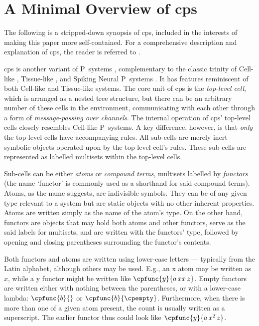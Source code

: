 \section{\label{sec:nmp:cpsreview}A Minimal Overview of \texorpdfstring{\gls{cps}}{cP~systems}}
The following is a stripped-down synopsis of \gls{cps}, included in the interests of making this paper more self-contained.  For a comprehensive description and explanation of \gls{cps}, the reader is referred to \cite{Henderson2019,Henderson2020,Nicolescu2018}.

\gls{cps} is another variant of P~systems \cite{Paun2001,Paun2002a,Paun2010b}, complementary to the classic trinity of Cell-like \cite{Paun2000}, Tissue-like \cite{Martin-Vide2003}, and Spiking Neural P~systems \cite{Ionescu2006}.  It has features reminiscent of both Cell-like and Tissue-like systems.  The core unit of \gls{cps} is the \emph{top-level cell}, which is arranged as a nested tree structure, but there can be an arbitrary number of these cells in the environment, communicating with each other through a form of \emph{message-passing over channels}.  The internal operation of \gls{cps}' top-level cells closely resembles Cell-like P~systems.  A key difference, however, is that \emph{only} the top-level cells have accompanying rules.  All sub-cells are merely inert symbolic objects operated upon by the top-level cell's rules.  These sub-cells are represented as labelled multisets within the top-level cells.

Sub-cells can be either \emph{atoms} or \emph{compound terms}, multisets labelled by \emph{functors} (the name `functor' is commonly used as a shorthand for said compound terms).  Atoms, as the name suggests, are indivisible symbols.  They can be of any given type relevant to a system but are static objects with no other inherent properties.  Atoms are written simply as the name of the atom's type.  On the other hand, functors are objects that may hold both atoms and other functors, serve as the said labels for multisets, and are written with the functors' type, followed by opening and closing parentheses surrounding the functor's contents.

Both functors and atoms are written using lower-case letters --- typically from the Latin alphabet, although others may be used.  E.g., an x atom may be written as \(x\), while a y functor might be written like \(\cpfunc{y}{a \, xx \, z}\).  Empty functors are written either with nothing between the parentheses, or with a lower-case lambda: \(\cpfunc{b}{}\) or \(\cpfunc{b}{\cpempty}\).  Furthermore, when there is more than one of a given atom present, the count is usually written as a superscript.  The earlier functor thus could look like \(\cpfunc{y}{a \, x^2 \, z}\).

